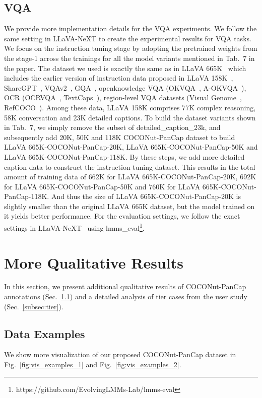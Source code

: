 \subsection{VQA}
\label{subsec:vqa}
We provide more implementation details for the VQA experiments. We follow the same setting in LLaVA-NeXT to create the experimental results for VQA tasks. We focus on the instruction tuning stage by adopting the pretrained weights from the stage-1 across the trainings for all the model variants mentioned in Tab.~7 in the paper. The dataset we used is exactly the same as in LLaVA 665K~\cite{liu2023improvedllava} which includes the earlier version of instruction data proposed in LLaVA 158K~\cite{liu2023llava}, ShareGPT~\cite{sharegpt}, VQAv2~\cite{mao2016vqav2}, GQA~\cite{hudson2019gqa}, openknowledge VQA (OKVQA~\cite{marino2019okvqa}, A-OKVQA~\cite{schwenk2022aokvqa}), OCR (OCRVQA~\cite{mishra2019ocrvqa}, TextCaps~\cite{sidorov2020textcaps}), region-level VQA datasets (Visual Genome~\cite{krishna2017visualgenome}, RefCOCO~\cite{kazemzadeh2014refcoco}). Among these data, LLaVA 158K comprises 77K complex reasoning, 58K conversation and 23K detailed captions. To build the dataset variants shown in Tab.~7, we simply remove the subset of detailed\_caption\_23k, and subsequently add 20K, 50K and 118K COCONut-PanCap dataset to build LLaVA 665K-COCONut-PanCap-20K, LLaVA 665K-COCONut-PanCap-50K and LLaVA 665K-COCONut-PanCap-118K. By these steps, we add more detailed caption data to construct the instruction tuning dataset. This results in the total amount of training data of 662K for LLaVA 665K-COCONut-PanCap-20K, 692K for LLaVA 665K-COCONut-PanCap-50K and 760K for LLaVA 665K-COCONut-PanCap-118K. And thus the size of LLaVA 665K-COCONut-PanCap-20K is slightly smaller than the original LLaVA 665K dataset, but the model trained on it yields better performance. For the evaluation settings, we follow the exact settings in LLaVA-NeXT~\cite{liu2024llavanext} using lmms\_eval\footnote{https://github.com/EvolvingLMMs-Lab/lmms-eval}.


\section{More Qualitative Results}
\label{sec:qualitative_results}
In this section, we present additional qualitative results of COCONut-PanCap annotations (Sec.~\ref{subsec:data}) and a detailed analysis of tier cases from the user study (Sec.~\ref{subsec:tier}).

\subsection{Data Examples}
\label{subsec:data}
We show more visualization of our proposed COCONut-PanCap dataset in Fig.~\ref{fig:vis_examples_1} and Fig.~\ref{fig:vis_examples_2}.




